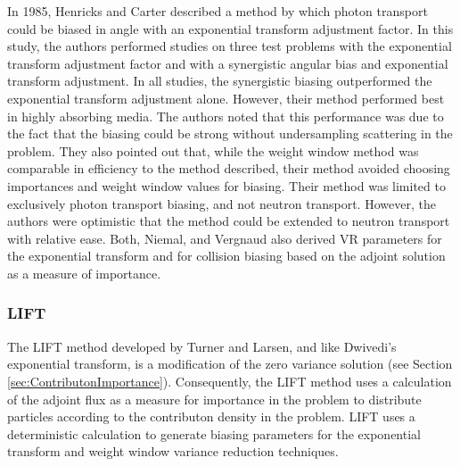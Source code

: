 In 1985, Henricks and Carter \cite{hendricks_anisotropic_1985} described a
method by which
photon transport could be biased in angle with an exponential transform
adjustment factor.
In this study, the authors performed studies on three test problems with the
exponential
transform adjustment factor and with a synergistic angular bias and exponential
transform
adjustment.
In all studies, the synergistic biasing outperformed the exponential transform
adjustment
alone.
However, their method performed best in highly absorbing media.
The authors noted that this performance was due to the fact that the biasing
could be
strong without undersampling scattering in the problem.
They also pointed out that, while the weight window method was comparable in
efficiency to the
method described, their method avoided choosing importances and
weight window
values for biasing. Their method was limited to exclusively photon transport
biasing, and not
neutron transport. However,
the authors were optimistic that the method could be extended to neutron
transport with relative ease.
Both, Niemal, and Vergnaud \cite{both_automated_1990} also derived VR parameters for
the exponential transform and for collision biasing based on the adjoint
solution as a measure of importance.

\subsubsection{LIFT}
\label{subsec:LIFT}

The LIFT \cite{turner_automatic_1997, turner_automatic_1997-1} method
developed by Turner and Larsen, and like Dwivedi's exponential transform, is
a modification
of the zero variance solution (see Section \ref{sec:ContributonImportance}).
Consequently, the LIFT method uses a calculation of the adjoint flux as a measure
for importance in the problem to distribute particles according to the
contributon density in the problem.
LIFT uses a deterministic calculation to
generate biasing
parameters for the exponential transform and weight window variance reduction
techniques.

